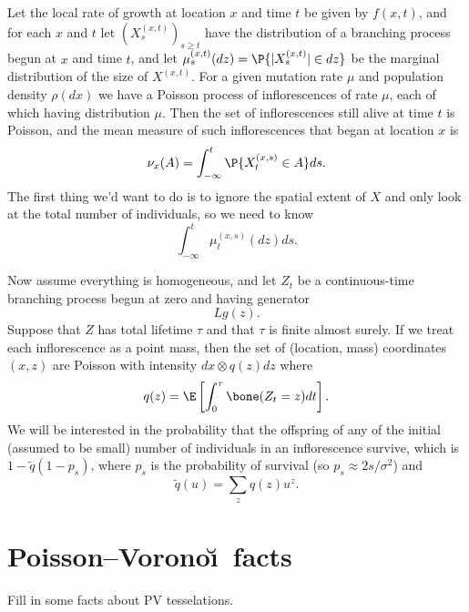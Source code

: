 \documentclass{article}
\begin{document}
Let the local rate of growth at location $x$ and time $t$ be given by $f(x,t)$,
and for each $x$ and $t$ let $(X^{(x,t)}_{s})_{s \ge t}$ have the distribution of a branching process begun at $x$ and time $t$,
and let $\mu^{(x,t)}_s(dz) = \P\{ |X^{(x,t)}_s| \in dz \}$  be the marginal distribution of the size of $X^{(x,t)}$.
For a given mutation rate $\mu$ and population density $\rho(dx)$ we have a Poisson process of inflorescences of rate $\mu$,
each of which having distribution $\mu$.  
Then the set of inflorescences still alive at time $t$ is Poisson, 
and the mean measure of such inflorescences that began at location $x$ is
\[ \nu_x(A) = \int_{-\infty}^t \P\{ X^{(x,s)}_t \in A \} ds .\]
The first thing we'd want to do is to ignore the spatial extent of $X$ and only look at the total number of individuals,
so we need to know
\[ \int_{-\infty}^t \mu^{(x,s)}_t(dz) ds . \]

Now assume everything is homogeneous, and let $Z_t$ be a continuous-time branching process begun at zero 
and having generator
\[ Lg(z) .\]
Suppose that $Z$ has total lifetime $\tau$ and that $\tau$ is finite almost surely.
If we treat each inflorescence as a point mass, then the set of (location, mass) coordinates $(x,z)$
are Poisson with intensity $dx \otimes q(z) dz$ where
\[  
  q(z) = \E \left[ \int_0^\tau \bone(Z_t = z) dt \right] .
\]
We will be interested in the probability that the offspring of any of the initial (assumed to be small) number of individuals in an inflorescence survive,
which is $1 - \widetilde q(1-p_s)$, where $p_s$ is the probability of survival (so $p_s \approx 2s/\sigma^2$) and
\[
  \widetilde q(u) = \sum_z q(z) u^z .
\]

\section{Poisson--Vorono\u\i\ facts}

Fill in some facts about PV tesselations.
\end{document}
